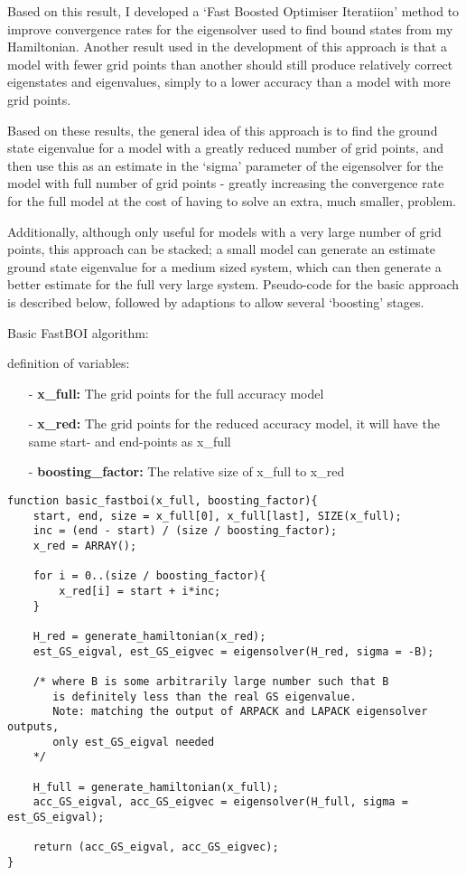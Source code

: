 Based on this result, I developed a `Fast Boosted Optimiser Iteratiion' method to improve convergence rates for the eigensolver used to find bound states from my Hamiltonian. Another result used in the development of this approach is that a model with fewer grid points than another should still produce relatively correct eigenstates and eigenvalues, simply to a lower accuracy than a model with more grid points. 

Based on these results, the general idea of this approach is to find the ground state eigenvalue for a model with a greatly reduced number of grid points, and then use this as an estimate in the `sigma' parameter of the eigensolver for the model with full number of grid points - greatly increasing the convergence rate for the full model at the cost of having to solve an extra, much smaller, problem. 

Additionally, although only useful for models with a very large number of grid points, this approach can be stacked; a small model can generate an estimate ground state eigenvalue for a medium sized system, which can then generate a better estimate for the full very large system. Pseudo-code for the basic approach is described below, followed by  adaptions to allow several `boosting' stages.

Basic FastBOI algorithm:

definition of variables:
\begin{itemize}

	\item[-]{\textbf{x_full:} The grid points for the full accuracy model}
	\item[-]{\textbf{x_red:} The grid points for the reduced accuracy model, it will have the same start- and end-points as x_full}
	\item[-]{\textbf{boosting_factor:} The relative size of x_full to x_red}

\end{itemize}

\begin{lstlisting}
function basic_fastboi(x_full, boosting_factor){
	start, end, size = x_full[0], x_full[last], SIZE(x_full);
	inc = (end - start) / (size / boosting_factor);
	x_red = ARRAY();

	for i = 0..(size / boosting_factor){
		x_red[i] = start + i*inc;
	}

	H_red = generate_hamiltonian(x_red); 
	est_GS_eigval, est_GS_eigvec = eigensolver(H_red, sigma = -B);
	
	/* where B is some arbitrarily large number such that B
	   is definitely less than the real GS eigenvalue.
	   Note: matching the output of ARPACK and LAPACK eigensolver outputs,
	   only est_GS_eigval needed
	*/ 
	
	H_full = generate_hamiltonian(x_full);
	acc_GS_eigval, acc_GS_eigvec = eigensolver(H_full, sigma = est_GS_eigval);
	
	return (acc_GS_eigval, acc_GS_eigvec);
}
\end{lstlisting}

